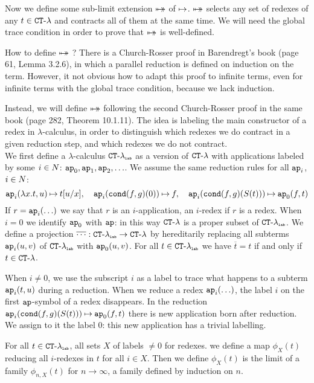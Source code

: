Now we define some sub-limit extension ${\mapsto\!\!\!\!\! \mapsto}$ of $\mathbin{\mapsto}$.
${\mapsto\!\!\!\!\! \mapsto}$ selects any set of redexes of any $t \in { {\tt CT} \mbox{-} \lambda}$ 
and contracts all of them at the same time. 
We will need the global trace condition in order to prove that ${\mapsto\!\!\!\!\! \mapsto}$ is well-defined.

How to define  ${\mapsto\!\!\!\!\! \mapsto}$ ?
There is a Church-Rosser proof in Barendregt's book (page 61, Lemma 3.2.6),
in which a parallel reduction is defined on induction on the term. 
However, it not obvious how to adapt this proof to infinite terms,
even for infinite terms with the global trace condition, because we lack induction.

Instead, we will define ${\mapsto\!\!\!\!\! \mapsto}$ following the second
Church-Rosser proof in the same book (page 282, Theorem 10.1.11).
The idea is labeling the main constructor of a redex in $\lambda$-calculus,
in order to distinguish which redexes we do contract in a given reduction step, and which 
redexes we do not contract.
\\



We first define a $\lambda$-calculus ${{ {\tt CT} \mbox{-} \lambda}_{\mbox{\tiny \tt lab}}}$ as a version of ${ {\tt CT} \mbox{-} \lambda}$ 
with applications labeled by some $i \in {N}$:
${\tt ap}_0, {\tt ap}_1, {\tt ap}_2, \ldots$. We assume the same reduction rules for all ${\tt ap}_i$, $i \in {N}$:
$$
\ap_i(\lambda x.t,u) \reduces t[u/x], \ \ \ 
\ap_i(\cond(f,g)(0)) \reduces f, \ \ \ 
\ap_i(\cond(f,g)(S(t))) \reduces \ap_0(f,t)
$$
If $r = {\tt ap}_i(\ldots)$ we say that $r$ is an $i$-application, an $i$-redex if $r$ is a redex.
When $i=0$ we identify ${\tt ap}_0$ with ${\tt ap}$: in this way ${ {\tt CT} \mbox{-} \lambda}$  is a proper
subset of ${{ {\tt CT} \mbox{-} \lambda}_{\mbox{\tiny \tt lab}}}$.
We define a projection $\overline{\cdots} : {{ {\tt CT} \mbox{-} \lambda}_{\mbox{\tiny \tt lab}}} \rightarrow { {\tt CT} \mbox{-} \lambda}$
by hereditarily replacing all subterms ${\tt ap}_i(u,v)$ of ${{ {\tt CT} \mbox{-} \lambda}_{\mbox{\tiny \tt lab}}}$ with 
 ${\tt ap}_0(u,v)$. For all $t \in { { {\tt CT} \mbox{-} \lambda} _ {\mbox{\tiny \tt lab}} }$ we have  $\overline{t} = t$
if and only if $t \in { {\tt CT} \mbox{-} \lambda}$.

When $i \not = 0$, we use the subscript $i$ as a label to trace what
happens to a subterm ${\tt ap}_i(t,u)$ during a reduction. When we reduce a redex ${\tt ap}_i(\ldots)$,
the label $i$ on the first ${\tt ap}$-symbol of a redex disappears. 
In the reduction ${\tt ap}_i({\tt cond}(f,g)(S(t))) \mathbin{\mapsto} {\tt ap}_0(f,t)$ there is new application born after reduction. 
We assign to it the label $0$: this new application has a trivial labelling.


For all $t \in { { {\tt CT} \mbox{-} \lambda} _ {\mbox{\tiny \tt lab}} }$, all sets $X$ of labels $\not = 0$ for redexes.
we define a map  $\phi_X(t)$ reducing all $i$-redexes in $t$ for all $i \in X$. 
Then we define $\phi_X(t)$ is the limit of a family $\phi_{n,X}(t)$ for $n \rightarrow \infty$, 
a family defined by induction on $n$.


